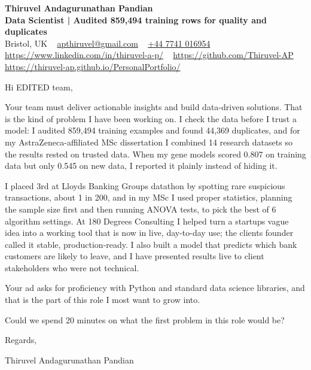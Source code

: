 \documentclass[11pt,a4paper]{article}
\newcommand{\num}[1]{\textbf{#1}}   %
\begin{document}
\raggedright
\pagestyle{empty}

\begin{center}
    {\LARGE \color{linkblue} \textbf{Thiruvel Andagurunathan Pandian}}\\[0.2cm]
    {\color{headernavy}\small\textbf{Data Scientist | Audited \num{859,494} training rows for quality and duplicates}}\\[0.2cm]
    {\small Bristol, UK\nobreak\ \,\textbar\, \href{mailto:apthiruvel@gmail.com}{apthiruvel@gmail.com}\nobreak\ \,\textbar\, \href{tel:+447741016954}{+44 7741 016954}\nobreak\ \,\textbar\, \href{https://www.linkedin.com/in/thiruvel-a-p/}{https://www.linkedin.com/in/thiruvel-a-p/}\nobreak\ \,\textbar\, \href{https://github.com/Thiruvel-AP}{https://github.com/Thiruvel-AP}\nobreak\ \,\textbar\, \href{https://thiruvel-ap.github.io/PersonalPortfolio/}{https://thiruvel-ap.github.io/PersonalPortfolio/}}

\end{center}

\vspace{0.4cm}

\noindent
Hi EDITED team,

Your team must deliver actionable insights and build data-driven solutions. That is the kind of problem I have been working on. I check the data before I trust a model: I audited 859,494 training examples and found 44,369 duplicates, and for my AstraZeneca-affiliated MSc dissertation I combined 14 research datasets so the results rested on trusted data. When my gene models scored 0.807 on training data but only 0.545 on new data, I reported it plainly instead of hiding it.

I placed 3rd at Lloyd\textquotesingle{}s Banking Group\textquotesingle{}s datathon by spotting rare suspicious transactions, about 1 in 200, and in my MSc I used proper statistics, planning the sample size first and then running ANOVA tests, to pick the best of 6 algorithm settings. At 180 Degrees Consulting I helped turn a startup\textquotesingle{}s vague idea into a working tool that is now in live, day-to-day use; the client\textquotesingle{}s founder called it \textquotedbl{}stable, production-ready\textquotedbl{}. I also built a model that predicts which bank customers are likely to leave, and I have presented results live to client stakeholders who were not technical.

Your ad asks for proficiency with Python and standard data science libraries, and that is the part of this role I most want to grow into.

Could we spend 20 minutes on what the first problem in this role would be?

\vspace{0.5cm}

Regards,

Thiruvel Andagurunathan Pandian
\end{document}
